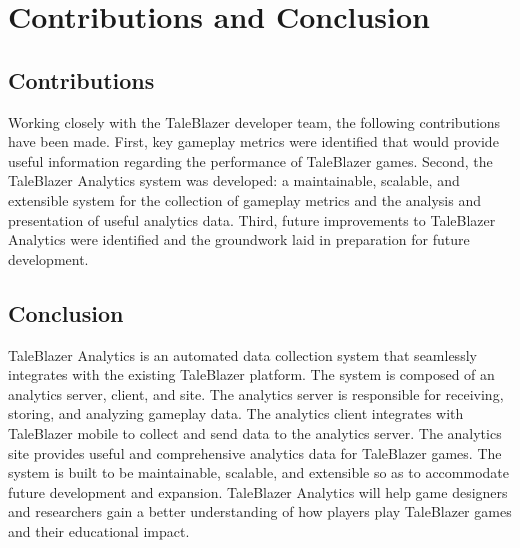 \chapter{Contributions and Conclusion}

\section{Contributions}

Working closely with the TaleBlazer developer team, the following contributions have been made. First, key gameplay metrics were identified that would provide useful information regarding the performance of TaleBlazer games. Second, the TaleBlazer Analytics system was developed: a maintainable, scalable, and extensible system for the collection of gameplay metrics and the analysis and presentation of useful analytics data. Third, future improvements to TaleBlazer Analytics were identified and the groundwork laid in preparation for future development. 

\section{Conclusion}

TaleBlazer Analytics is an automated data collection system that seamlessly integrates with the existing TaleBlazer platform. The system is composed of an analytics server, client, and site. The analytics server is responsible for receiving, storing, and analyzing gameplay data. The analytics client integrates with TaleBlazer mobile to collect and send data to the analytics server. The analytics site provides useful and comprehensive analytics data for TaleBlazer games. The system is built to be maintainable, scalable, and extensible so as to accommodate future development and expansion. TaleBlazer Analytics will help game designers and researchers gain a better understanding of how players play TaleBlazer games and their educational impact.